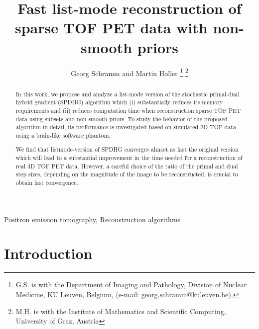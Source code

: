 \documentclass{IEEEtran}
\begin{document}
\title{\vspace{-0.5cm}Fast list-mode reconstruction of sparse TOF PET data with non-smooth priors} 
\author{Georg Schramm and Martin Holler\vspace{-1cm}
\thanks{G.S. is with the Department of Imaging and Pathology, Division of Nuclear Medicine,
KU Leuven, Belgium, (e-mail: georg.schramm@kuleuven.be).}
\thanks{M.H. is with the Institute of Mathematics and Scientific Computing, 
University of Graz, Austria}
}

\maketitle

\begin{abstract}
In this work, we propose and analyze a list-mode version of the stochastic primal-dual hybrid gradient
(SPDHG) algorithm which (i) substantially reduces its memory requirements and (ii) reduces
computation time when reconstruction sparse TOF PET data using subsets and non-smooth priors. 
To study the behavior of the proposed algorithm in detail, its performance 
is investigated based on simulated 2D TOF data using a brain-like software phantom.

We find that listmode-version of SPDHG converges almost as fast the original version
which will lead to a substantial improvement in the time needed for a reconstruction
of real 3D TOF PET data.
However, a careful choice of the ratio of the primal and dual step sizes, 
depending on the magnitude of the image to be reconstructed, is crucial to obtain fast convergence.
\end{abstract}

\begin{IEEEkeywords}
Positron emission tomography, Reconstruction algorithms
\end{IEEEkeywords}

\section{Introduction}
\end{document}
